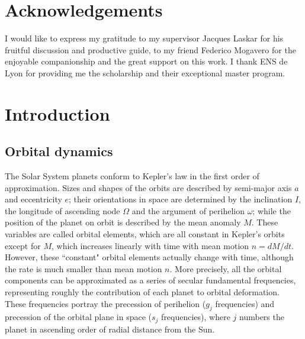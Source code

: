 \documentclass[12pt]{article}
\begin{document}
	\section*{Acknowledgements}
	I would like to express my gratitude to my supervisor Jacques Laskar for his fruitful discussion and productive guide, to my friend Federico Mogavero for the enjoyable companionship and the great support on this work. I thank ENS de Lyon for providing me the scholarship and their exceptional master program. 
	
	\newpage
	\tableofcontents
	\newpage
	\listoffigures
	\listoftables
	\newpage
	\section{Introduction} 
	\subsection{Orbital dynamics}
	The Solar System planets conform to Kepler's law in the first order of approximation. Sizes and shapes of the orbits are described by semi-major axis $a$ and eccentricity $e$; their orientations in space are determined by the inclination $I$, the longitude of ascending node $\Omega$ and the argument of perihelion $\omega$; while the position of the planet on orbit is described by the mean anomaly $M$. These variables are called orbital elements, which are all constant in Kepler's orbits except for $M$, which increases linearly with time with mean motion $n = dM/dt$. However, these ``constant" orbital elements actually change with time, although the rate is much smaller than mean motion $n$. More precisely, all the orbital components can be approximated as a series of secular fundamental frequencies, representing roughly the contribution of each planet to orbital deformation. These frequencies portray the precession of perihelion ($g_j$ frequencies) and precession of the orbital plane in space ($s_j$ frequencies), where $j$ numbers the planet in ascending order of radial distance from the Sun.
	
\end{document}
